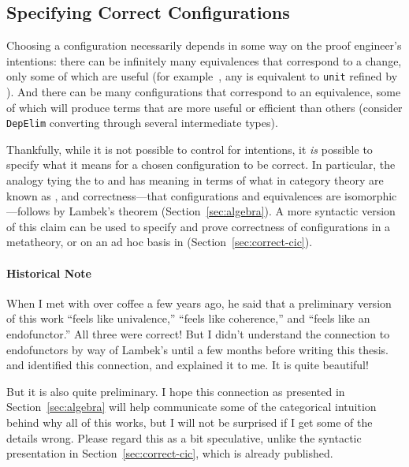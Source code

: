 \subsection{Specifying Correct Configurations}
\label{sec:art}

Choosing a configuration necessarily depends in some way on the proof engineer's intentions:
there can be infinitely many equivalences that correspond to a 
change, only some of which are useful (for example~\href{https://github.com/uwplse/pumpkin-pi/blob/v2.0.0/plugin/coq/playground/refine_unit.v}{}, any \Aa is equivalent to \lstinline{unit} refined by \Aa). %
And there can be many configurations that correspond
to an equivalence, some of which will produce terms that are more useful or efficient than others
(consider \lstinline{DepElim} converting through several intermediate types).

Thankfully, while it is not possible to control for intentions,
it \textit{is} possible to specify what it means for a chosen configuration to be correct.
In particular, the analogy tying the  to  and 
has meaning in terms of what in category theory are known as ,
and correctness---that configurations and equivalences are isomorphic---follows by Lambek's 
theorem (Section~\ref{sec:algebra}).
A more syntactic version of this claim can be used to specify and prove correctness of configurations in a  metatheory,
or on an ad hoc basis in  (Section~\ref{sec:correct-cic}).

\paragraph{Historical Note}
When I met with  over coffee a few years ago, he said that a preliminary version of this work ``feels like univalence,'' ``feels like coherence,'' and ``feels like an endofunctor.'' All three were correct! But I didn't understand the connection to endofunctors by way of Lambek's until a few months before writing this thesis.
 and  identified this connection, and  explained it to me.
It is quite beautiful!

But it is also quite preliminary. I hope this connection as presented in Section~\ref{sec:algebra} will help 
communicate some of the categorical intuition behind why all of this works, but I will not be surprised if I get some of the details wrong.
Please regard this as a bit speculative, unlike the syntactic presentation in Section~\ref{sec:correct-cic},
which is already published.

